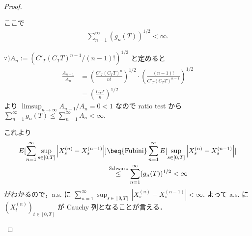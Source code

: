 \documentclass{jsarticle}
\begin{document}
\begin{proof}
\begin{enumerate}[label=(\roman*)]



        ここで
        \begin{align}
            \sum_{n=1}^{\infty}(g_n(T))^{1/2}<\infty.
        \end{align}

        \begin{screen}
            $\because) A_n:=(C'_T(C_T T)^{n-1}/(n-1)!)^{1/2}$ と定めると
            \begin{align}
                \frac{A_{n+1}}{A_n}
                &= \left(\frac{C'_T(C_T T)^{n}}{n!}\right)^{1/2}\cdot \left(\frac{(n-1)!}{C'_T(C_T T)^{n-1}}\right)^{1/2} \\
                &= \left(\frac{C_T T}{n}\right)^{1/2}
            \end{align}
            より $\limsup_{n\to\infty}A_{n+1}/A_n=0<1$ なので ratio test から $\sum_{n=1}^{\infty}g_n(T)\le\sum_{n=1}^{\infty}A_n<\infty.$
        \end{screen}

        これより
        \begin{align}
            E[\sum_{n=1}^{\infty}\sup_{s\in[0, T]}\left\lvert X_s^{(n)}-X_s^{(n-1)}\right\rvert]
            &\beq{\text{Fubini}} \sum_{n=1}^{\infty}E[\sup_{s\in[0, T]}\left\lvert X_s^{(n)}-X_s^{(n-1)}\right\rvert] \\
            &\stackrel{\text{Schwarz}}{\le} \sum_{n=1}^{\infty}(g_n(T))^{1/2} < \infty
        \end{align}
        がわかるので，a.s. に $\sum_{n=1}^{\infty}\sup_{s\in[0, T]}\left\lvert X_s^{(n)}-X_s^{(n-1)}\right\rvert<\infty.$
        よって a.s. に $(X_t^{(n)})_{t\in[0, T]}$ が Cauchy 列となることが言える．


\end{enumerate}
\end{proof}
\end{document}
